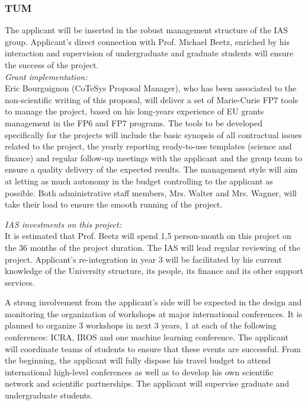 \subsubsection{TUM}
The applicant will be inserted in the robust management structure of the IAS group. 
Applicant's direct connection with Prof. Michael Beetz, enriched by his interaction 
and supervision of undergraduate and graduate students  will ensure the success of the project. \\
\emph{Grant implementation:}\\
Eric Bourguignon  (CoTeSys Proposal Manager), who  has been associated
to the  non-scientific writing of  this proposal, will deliver  a
set of Marie-Curie FP7  tools to manage the  project, based on
his long-years experience  of EU grants management in  the FP6 and FP7
programs. The tools to be developed specifically for the projects will
include the  basic synopsis of  all contractual issues related  to the
project,  the  yearly reporting  ready-to-use  templates (science  and
finance) and regular follow-up meetings  with the applicant and the group 
team to ensure  a quality  delivery of  the expected  results.  The management
style will aim  at letting as much autonomy  in the budget controlling
to the applicant as possible. Both  administrative staff members, Mrs. Walter and
Mrs. Wagner, will take their load  to ensure the smooth running of the
project.

\emph{IAS investments on this project:}\\
It is estimated  that Prof. Beetz will spend  1,5 person-month on this
project on the 36 months of  the project duration. The IAS will lead
regular  reviewing of the  project. Applicant's re-integration
in  year  3  will  be  facilitated  by his  current  knowledge  of  the
University  structure,  its people,  its  finance and  its other  support
services.


A strong involvement from the applicant's side will be expected in the design
and  monitoring  the organization   of  workshops at  major international
conferences. It is planned to organize 3 workshops in next 3 years, 1 at each of the
following conferences: ICRA, IROS and one machine learning conference. The applicant  will  coordinate  teams of
students  to  ensure  that  these  events are  successful.   From  the
beginning,  the applicant will fully  dispose his  travel budget  to attend
international  high-level conferences  as well  as to  develop  his own
scientific  network  and scientific  partnerships.   The applicant will  supervise
graduate and undergraduate students.

